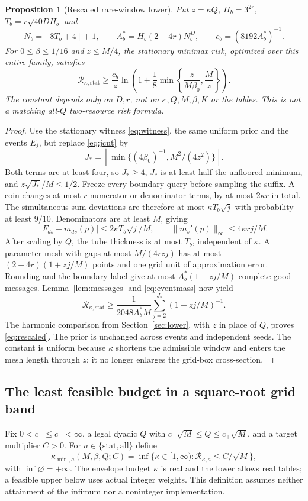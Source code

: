 \documentclass[11pt,letterpaper]{article}
\newtheorem{proposition}[theorem]{Proposition}
\theoremstyle{definition}\newtheorem{definition}[theorem]{Definition}
\theoremstyle{remark}\newtheorem{remark}[theorem]{Remark}
\newcommand{\floor}[1]{\left\lfloor #1\right\rfloor}
\newcommand{\ceil}[1]{\left\lceil #1\right\rceil}
\newcommand{\betaz}{\beta_0}
\newcommand{\Risk}{\mathcal{R}}
\begin{document}
\begin{proposition}[Rescaled rare-window lower]\label{prop:rescaled}
Put $z=\kappa Q$, $H_b=3^{2r}$, $T_b=r\sqrt{40DH_b}$ and
\[
 N_b=\ceil{8T_b+4}+1,\qquad
 A_b^*=H_b(2+4r)N_b^D,\qquad c_b=(8192A_b^*)^{-1}.
\]
For $0\le\beta\le1/16$ and $z\le M/4$, the stationary minimax risk, optimized over this entire family, satisfies
\begin{equation}\label{eq:rescaled}
 \Risk_{\kappa,\mathrm{stat}}\ge
 \frac{c_b}{z}\ln\left(1+\frac18\min\left\{\frac{z}{M\betaz},\frac Mz\right\}\right).
\end{equation}
The constant depends only on $D,r$, not on $\kappa,Q,M,\beta,K$ or the tables. This is not a matching all-$Q$ two-resource risk formula.
\end{proposition}
\begin{proof}
Use the stationary witness \eqref{eq:witness}, the same uniform prior and the events $E_j$, but replace \eqref{eq:jcut} by
\[
 J_*=\floor{\min\{(4\betaz)^{-1},M^2/(4z^2)\}}.
\]
Both terms are at least four, so $J_*\ge4$, $J_*$ is at least half the unfloored minimum, and $z\sqrt{J_*}/M\le1/2$. Freeze every boundary query before sampling the suffix. A coin changes at most $r$ numerator or denominator terms, by at most $2\kappa r$ in total. The simultaneous sum deviations are therefore at most $\kappa T_b\sqrt j$ with probability at least $9/10$. Denominators are at least $M$, giving
\[
 |F_{ds}-m_{ds}(p)|\le2\kappa T_b\sqrt j/M,\qquad
 \|m_s'(p)\|_\infty\le4\kappa rj/M.
\]
After scaling by $Q$, the tube thickness is at most $T_b$, independent of $\kappa$. A parameter mesh with gaps at most $M/(4rzj)$ has at most $(2+4r)(1+zj/M)$ points and one grid unit of approximation error. Rounding and the boundary label give at most $A_b^*(1+zj/M)$ complete good messages. Lemma~\ref{lem:messages} and \eqref{eq:eventmass} now yield
\[
 \Risk_{\kappa,\mathrm{stat}}\ge
 \frac1{2048A_b^*M}\sum_{j=2}^{J_*}(1+zj/M)^{-1}.
\]
The harmonic comparison from Section~\ref{sec:lower}, with $z$ in place of $Q$, proves \eqref{eq:rescaled}. The prior is unchanged across events and independent seeds. The constant is uniform because $\kappa$ shortens the admissible window and enters the mesh length through $z$; it no longer enlarges the grid-box cross-section.
\end{proof}

\subsection{The least feasible budget in a square-root grid band}
Fix $0<c_-\le c_+<\infty$, a legal dyadic $Q$ with $c_-\sqrt M\le Q\le c_+\sqrt M$, and a target multiplier $C>0$. For $a\in\{\mathrm{stat},\mathrm{all}\}$ define
\begin{equation}\label{eq:kappamin}
 \kappa_{\min,a}(M,\beta,Q;C)
 =\inf\{\kappa\in[1,\infty):\Risk_{\kappa,a}\le C/\sqrt M\},
\end{equation}
with $\inf\varnothing=+\infty$. The envelope budget $\kappa$ is real and the lower allows real tables; a feasible upper below uses actual integer weights. This definition assumes neither attainment of the infimum nor a noninteger implementation.
\end{document}
